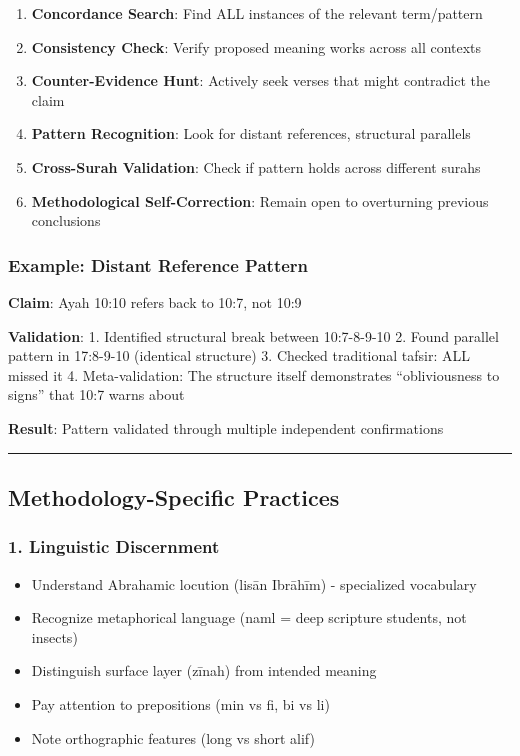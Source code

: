 \documentclass[12pt,a4paper]{article}
\providecommand{\tightlist}{\setlength{\itemsep}{0pt}\setlength{\parskip}{0pt}}
\begin{document}
\begin{enumerate}
\def\labelenumi{\arabic{enumi}.}
\tightlist
\item
  \textbf{Concordance Search}: Find ALL instances of the relevant
  term/pattern
\item
  \textbf{Consistency Check}: Verify proposed meaning works across all
  contexts
\item
  \textbf{Counter-Evidence Hunt}: Actively seek verses that might
  contradict the claim
\item
  \textbf{Pattern Recognition}: Look for distant references, structural
  parallels
\item
  \textbf{Cross-Surah Validation}: Check if pattern holds across
  different surahs
\item
  \textbf{Methodological Self-Correction}: Remain open to overturning
  previous conclusions
\end{enumerate}

\subsubsection{Example: Distant Reference
Pattern}\label{example-distant-reference-pattern}

\textbf{Claim}: Ayah 10:10 refers back to 10:7, not 10:9

\textbf{Validation}: 1. Identified structural break between 10:7-8-9-10
2. Found parallel pattern in 17:8-9-10 (identical structure) 3. Checked
traditional tafsir: ALL missed it 4. Meta-validation: The structure
itself demonstrates ``obliviousness to signs'' that 10:7 warns about

\textbf{Result}: Pattern validated through multiple independent
confirmations

\begin{center}\rule{0.5\linewidth}{0.5pt}\end{center}

\subsection{Methodology-Specific
Practices}\label{methodology-specific-practices}

\subsubsection{1. Linguistic Discernment}\label{linguistic-discernment}

\begin{itemize}
\tightlist
\item
  Understand Abrahamic locution (lisān Ibrāhīm) - specialized vocabulary
\item
  Recognize metaphorical language (naml = deep scripture students, not
  insects)
\item
  Distinguish surface layer (zīnah) from intended meaning
\item
  Pay attention to prepositions (min vs fi, bi vs li)
\item
  Note orthographic features (long vs short alif)
\end{itemize}
\end{document}
